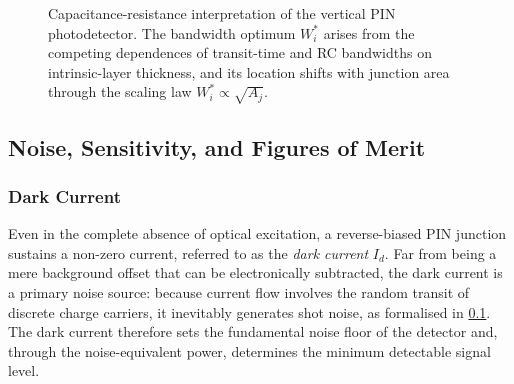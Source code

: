 \begin{figure}[H]
    \centering
    \caption{Capacitance-resistance interpretation of the vertical PIN
    photodetector. The bandwidth optimum $W_i^*$ arises from the competing
    dependences of transit-time and RC bandwidths on intrinsic-layer thickness,
    and its location shifts with junction area through the scaling law
    $W_i^* \propto \sqrt{A_j}$.}
    \label{fig:rc_concept}
\end{figure}

\subsection[Noise, Sensitivity, and Figures of Merit]{Noise, Sensitivity, and Figures of Merit}
\label{subsec:pd_noise}

\subsubsection{Dark Current}
\label{subsubsec:pd_dark}

Even in the complete absence of optical excitation, a reverse-biased PIN
junction sustains a non-zero current, referred to as the \emph{dark current}
$I_d$. Far from being a mere background offset that can be electronically
subtracted, the dark current is a primary noise source: because current flow
involves the random transit of discrete charge carriers, it inevitably generates
shot noise, as formalised in \cref{subsec:pd_noise}. The dark current therefore
sets the fundamental noise floor of the detector and, through the
noise-equivalent power, determines the minimum detectable signal level.

